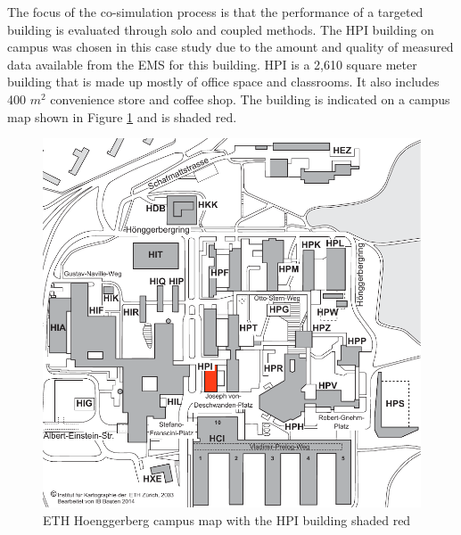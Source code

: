 \documentclass{tBPS2e}
\theoremstyle{plain}
\theoremstyle{definition}
\theoremstyle{remark}
\providecommand{\DIFaddbegin}{} %
\providecommand{\DIFaddend}{} %
\begin{document}

\DIFaddbegin 


\DIFaddend The focus of the co-simulation process is that the performance of a targeted
building is evaluated through solo and coupled methods. The HPI building on
campus was chosen in this case study due to the amount and quality of measured
data available from the EMS for this building. HPI is a 2,610 square meter
building that is made up mostly of office space and classrooms. It also
includes 400 $m^2$ convenience store and coffee shop. The building is
indicated on a campus map shown in Figure \ref{fig:campusmap} and is shaded
red.


\DIFaddbegin 

\DIFaddend \begin{figure}[H]
\centering
\includegraphics[scale=0.5]{figures/ETH_Hoenngerbergcamp_targetedbuildings_HPI}
\caption{ETH Hoenggerberg campus map with the HPI building shaded red}
\label{fig:campusmap}
\end{figure}
\end{document}
